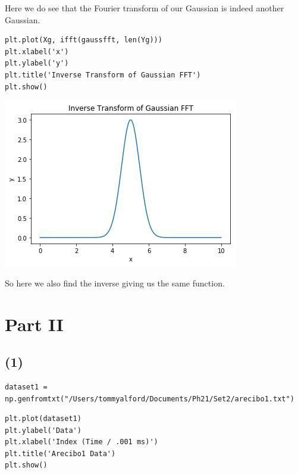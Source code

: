 \documentclass[11pt]{article}
\begin{document}
Here we do see that the Fourier transform of our Gaussian is indeed another
Gaussian.

\begin{verbatim}
plt.plot(Xg, ifft(gaussfft, len(Yg)))
plt.xlabel('x')
plt.ylabel('y')
plt.title('Inverse Transform of Gaussian FFT')
plt.show()
\end{verbatim}

\includegraphics[width=.9\linewidth]{./obipy-resources/17087VJp.png}

So here we also find the inverse giving us the same function.

\section*{Part II}
\label{sec-2}

\subsection*{(1)}
\label{sec-2-1}

\begin{verbatim}
dataset1 = np.genfromtxt("/Users/tommyalford/Documents/Ph21/Set2/arecibo1.txt")
\end{verbatim}


\begin{verbatim}
plt.plot(dataset1)
plt.ylabel('Data')
plt.xlabel('Index (Time / .001 ms)')
plt.title('Arecibo1 Data')
plt.show()
\end{verbatim}
\end{document}
